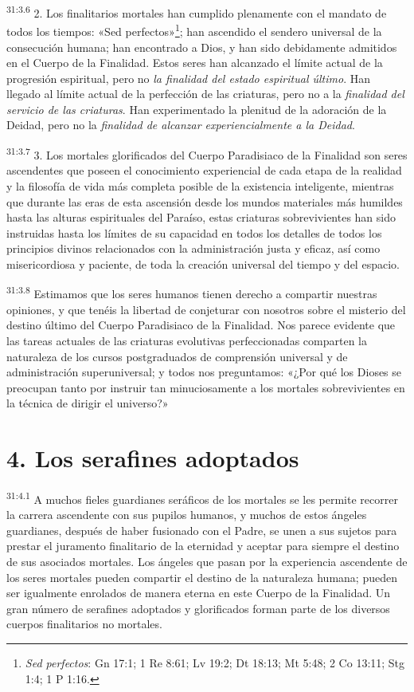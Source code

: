 \par
\textsuperscript{31:3.6} 2. Los finalitarios mortales han cumplido plenamente con el mandato de todos los tiempos: «Sed perfectos»\footnote{\textit{Sed perfectos}: Gn 17:1; 1 Re 8:61; Lv 19:2; Dt 18:13; Mt 5:48; 2 Co 13:11; Stg 1:4; 1 P 1:16.}; han ascendido el sendero universal de la consecución humana; han encontrado a Dios, y han sido debidamente admitidos en el Cuerpo de la Finalidad. Estos seres han alcanzado el límite actual de la progresión espiritual, pero no \textit{la finalidad del estado espiritual último}. Han llegado al límite actual de la perfección de las criaturas, pero no a la \textit{finalidad del servicio de las criaturas}. Han experimentado la plenitud de la adoración de la Deidad, pero no la \textit{finalidad de alcanzar experiencialmente a la Deidad}.

\par
\textsuperscript{31:3.7} 3. Los mortales glorificados del Cuerpo Paradisiaco de la Finalidad son seres ascendentes que poseen el conocimiento experiencial de cada etapa de la realidad y la filosofía de vida más completa posible de la existencia inteligente, mientras que durante las eras de esta ascensión desde los mundos materiales más humildes hasta las alturas espirituales del Paraíso, estas criaturas sobrevivientes han sido instruidas hasta los límites de su capacidad en todos los detalles de todos los principios divinos relacionados con la administración justa y eficaz, así como misericordiosa y paciente, de toda la creación universal del tiempo y del espacio.

\par
\textsuperscript{31:3.8} Estimamos que los seres humanos tienen derecho a compartir nuestras opiniones, y que tenéis la libertad de conjeturar con nosotros sobre el misterio del destino último del Cuerpo Paradisiaco de la Finalidad. Nos parece evidente que las tareas actuales de las criaturas evolutivas perfeccionadas comparten la naturaleza de los cursos postgraduados de comprensión universal y de administración superuniversal; y todos nos preguntamos: «¿Por qué los Dioses se preocupan tanto por instruir tan minuciosamente a los mortales sobrevivientes en la técnica de dirigir el universo?»

\section*{4. Los serafines adoptados}
\par
\textsuperscript{31:4.1} A muchos fieles guardianes seráficos de los mortales se les permite recorrer la carrera ascendente con sus pupilos humanos, y muchos de estos ángeles guardianes, después de haber fusionado con el Padre, se unen a sus sujetos para prestar el juramento finalitario de la eternidad y aceptar para siempre el destino de sus asociados mortales. Los ángeles que pasan por la experiencia ascendente de los seres mortales pueden compartir el destino de la naturaleza humana; pueden ser igualmente enrolados de manera eterna en este Cuerpo de la Finalidad. Un gran número de serafines adoptados y glorificados forman parte de los diversos cuerpos finalitarios no mortales.

